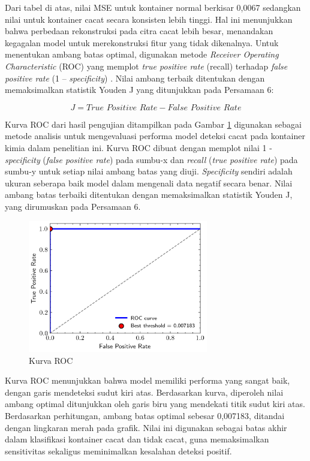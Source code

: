 Dari tabel di atas, nilai MSE untuk kontainer normal berkisar 0,0067
sedangkan nilai untuk kontainer cacat secara konsisten lebih tinggi.
Hal ini menunjukkan bahwa perbedaan rekonstruksi pada citra cacat
lebih besar, menandakan kegagalan model untuk merekonstruksi fitur
yang tidak dikenalnya. Untuk menentukan ambang batas optimal,
digunakan metode \textit{Receiver Operating Characteristic} (ROC)
yang memplot \textit{true positive rate} (recall) terhadap
\textit{false positive rate} (1 – \textit{specificity}) \citep{28}.
Nilai ambang terbaik ditentukan dengan memaksimalkan statistik Youden
J yang ditunjukkan pada Persamaan 6:

\begin{equation}
  J = \textit{True Positive Rate} - \textit{False Positive Rate}
\end{equation}

Kurva ROC dari hasil pengujian ditampilkan pada Gambar \ref{fig:roc}
digunakan sebagai metode analisis untuk mengevaluasi performa model
deteksi cacat pada kontainer kimia dalam penelitian ini. Kurva ROC dibuat
dengan memplot nilai 1 - \textit{specificity} (\textit{false positive
rate}) pada sumbu-x dan \textit{recall} (\textit{true positive rate})
pada sumbu-y untuk setiap nilai ambang batas yang diuji.
\textit{Specificity} sendiri adalah ukuran seberapa baik model dalam
mengenali data negatif secara benar. Nilai ambang batas terbaiki
ditentukan dengan memaksimalkan statistik Youden J, yang dirumuskan
pada Persamaan 6.

\begin{figure}[H]
  \centering
  \includegraphics[width=0.7\textwidth]{gambar/roc.png}
  \caption{Kurva ROC}
  \label{fig:roc}
\end{figure}
\vspace{-1em}

Kurva ROC menunjukkan bahwa model memiliki performa yang sangat baik,
dengan garis mendeteksi sudut kiri atas. Berdasarkan kurva, diperoleh
nilai ambang optimal ditunjukkan oleh garis biru yang mendekati titik
sudut kiri atas. Berdasarkan perhitungan, ambang batas optimal
sebesar 0,007183, ditandai dengan lingkaran merah pada grafik. Nilai
ini digunakan sebagai batas akhir dalam klasifikasi kontainer cacat
dan tidak cacat, guna memaksimalkan sensitivitas sekaligus
meminimalkan kesalahan deteksi positif.

